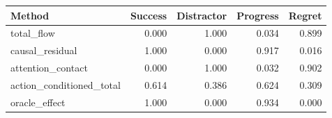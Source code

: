 \begin{tabular}{lrrrr}
\toprule
Method & Success & Distractor & Progress & Regret\\
\midrule
total\_flow & 0.000 & 1.000 & 0.034 & 0.899\\
causal\_residual & 1.000 & 0.000 & 0.917 & 0.016\\
attention\_contact & 0.000 & 1.000 & 0.032 & 0.902\\
action\_conditioned\_total & 0.614 & 0.386 & 0.624 & 0.309\\
oracle\_effect & 1.000 & 0.000 & 0.934 & 0.000\\
\bottomrule
\end{tabular}
